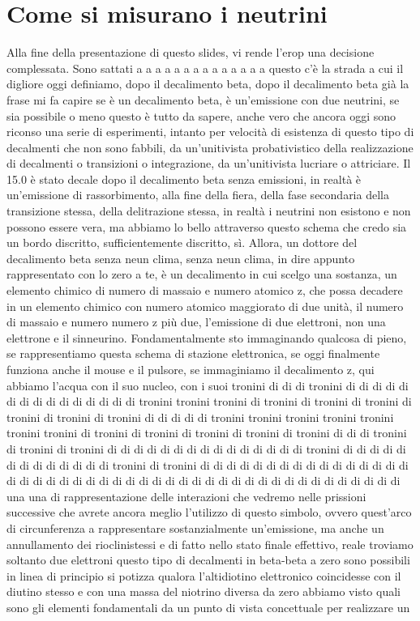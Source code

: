    \section{Come si misurano i neutrini}






    Alla fine della presentazione di questo slides, vi rende l'erop una decisione complessata. Sono sattati a a a a a a a a a a a a a a questo c'è la strada a cui il digliore oggi definiamo, dopo il decalimento beta, dopo il decalimento beta già la frase mi fa capire se è un decalimento beta, è un'emissione con due neutrini, se sia possibile o meno questo è tutto da sapere, anche vero che ancora oggi sono riconso una serie di esperimenti, intanto per velocità di esistenza di questo tipo di decalmenti che non sono fabbili, da un'unitivista probativistico della realizzazione di decalmenti o transizioni o integrazione, da un'unitivista lucriare o attriciare. Il 15.0 è stato decale dopo il decalimento beta senza emissioni, in realtà è un'emissione di rassorbimento, alla fine della fiera, della fase secondaria della transizione stessa, della delitrazione stessa, in realtà i neutrini non esistono e non possono essere vera, ma abbiamo lo bello attraverso questo schema che credo sia un bordo discritto, sufficientemente discritto, sì. Allora, un dottore del decalimento beta senza neun clima, senza neun clima, in dire appunto rappresentato con lo zero a te, è un decalimento in cui scelgo una sostanza, un elemento chimico di numero di massaio e numero atomico z, che possa decadere in un elemento chimico con numero atomico maggiorato di due unità, il numero di massaio e numero numero z più due, l'emissione di due elettroni, non una elettrone e il sinneurino. Fondamentalmente sto immaginando qualcosa di pieno, se rappresentiamo questa schema di stazione elettronica, se oggi finalmente funziona anche il mouse e il pulsore, se immaginiamo il decalimento z, qui abbiamo l'acqua con il suo nucleo, con i suoi tronini di di di tronini di di di di di di di di di di di di di di di tronini tronini tronini di tronini di tronini di tronini di tronini di tronini di tronini di di di di di tronini tronini tronini tronini tronini tronini tronini di tronini di tronini di tronini di tronini di tronini di di di tronini di tronini di tronini di di di di di di di di di di di di di di di tronini di di di di di di di di di di di di di tronini di tronini di di di di di di di di di di di di di di di di di di di di di di di di di di di di di di di di di di di di di di di di di di di di di di una una di rappresentazione delle interazioni che vedremo nelle prissioni successive che avrete ancora meglio l'utilizzo di questo simbolo, ovvero quest'arco di circunferenza a rappresentare sostanzialmente un'emissione, ma anche un annullamento dei rioclinistessi e di fatto nello stato finale effettivo, reale troviamo soltanto due elettroni questo tipo di decalmenti in beta-beta a zero sono possibili in linea di principio si potizza qualora l'altidiotino elettronico coincidesse con il diutino stesso e con una massa del niotrino diversa da zero abbiamo visto quali sono gli elementi fondamentali da un punto di vista concettuale per realizzare un 